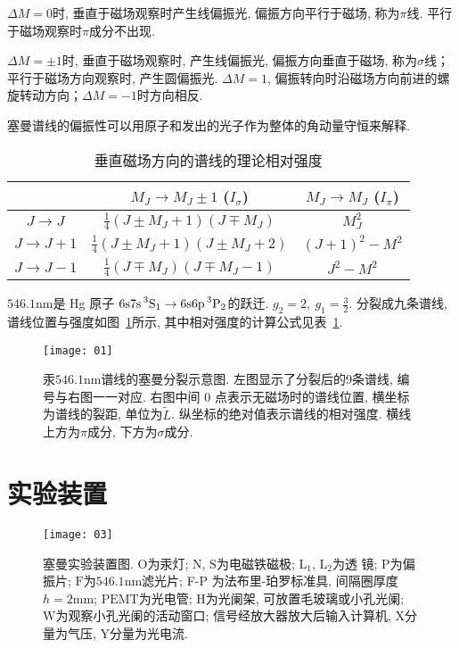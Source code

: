 \documentclass[aps,pre,12pt,preprint,onecolumn,showpacs,showkeys]{revtex4-1}
\begin{document}
$\Delta M=0$时, 垂直于磁场观察时产生线偏振光, 偏振方向平行于磁场, 称为$\pi$线. 平行于磁场观察时$\pi$成分不出现. 

$\Delta M=\pm 1$时, 垂直于磁场观察时, 产生线偏振光, 偏振方向垂直于磁场, 称为$\sigma$线；平行于磁场方向观察时, 产生圆偏振光. $\Delta M =  1$, 偏振转向时沿磁场方向前进的螺旋转动方向；$\Delta M=-1$时方向相反. 

塞曼谱线的偏振性可以用原子和发出的光子作为整体的角动量守恒来解释. 

\begin{table}[h]
\caption{\label{tab:table1}%
垂直磁场方向的谱线的理论相对强度}
\begin{tabular}{|c|c|c|}
\hline
&$M_J \to M_J \pm 1$ ($I_\sigma$) &$M_J \to M_J$ ($I_\pi$)\\\hline
$J \to J$&$\frac{1}{4}(J\pm M_J +1)(J\mp M_J)$&$M_J^2$\\\hline
$J \to J+1$&$\frac{1}{4}(J\pm M_J+1)(J\pm M_J +2)$&$(J+1)^2-M^2$\\\hline
$J \to J-1$&$\frac{1}{4}(J\mp M_J)(J\mp M_J-1)$&$J^2-M^2$\\\hline
\end{tabular}
\end{table}
$546.1 \mathrm{nm}$是 Hg 原子 $6\mathrm s 7\mathrm s \prescript{3}{}{\mathrm S}_1 \to 6 \mathrm{s} 6 \mathrm{p} \prescript{3}{}{\mathrm P}_2$的跃迁. $g_2=2,\ g_1=\frac{3}{2}$. 分裂成九条谱线, 谱线位置与强度如图~\ref{fig:分裂示意图}所示,  其中相对强度的计算公式见表~\ref{tab:table1}. 
\begin{figure}[h]
\centering
\texttt{[image: 01]}
\caption{\label{fig:分裂示意图}%
汞$546.1\mathrm{nm}$谱线的塞曼分裂示意图. 左图显示了分裂后的9条谱线, 编号与右图一一对应. 右图中间 0 点表示无磁场时的谱线位置, 横坐标为谱线的裂距, 单位为$\tilde L$. 纵坐标的绝对值表示谱线的相对强度. 横线上方为$\pi$成分, 下方为$\sigma$成分. }
\end{figure}
 
\section{实验装置}
\begin{figure}[h]
\centering
\texttt{[image: 03]}
\caption{\label{fig:实验装置}%
塞曼实验装置图. $\mathrm O$为汞灯; $\mathrm N$, $\mathrm S$为电磁铁磁极; $\mathrm L_1$, $\mathrm L_2$为透
镜; $\mathrm P$为偏振片; $\mathrm F$为$546.1 \mathrm{nm}$滤光片; F-P 为法布里-珀罗标准具, 间隔圈厚度$h=2\mathrm{mm}$; $\mathrm{PEMT}$为光电管; $\mathrm{H}$为光阑架, 可放置毛玻璃或小孔光阑; $\mathrm{W}$为观察小孔光阑的活动窗口; 信号经放大器放大后输入计算机, $\mathrm{X}$分量为气压, $\mathrm{Y}$分量为光电流.}
\end{figure}
\end{document}
